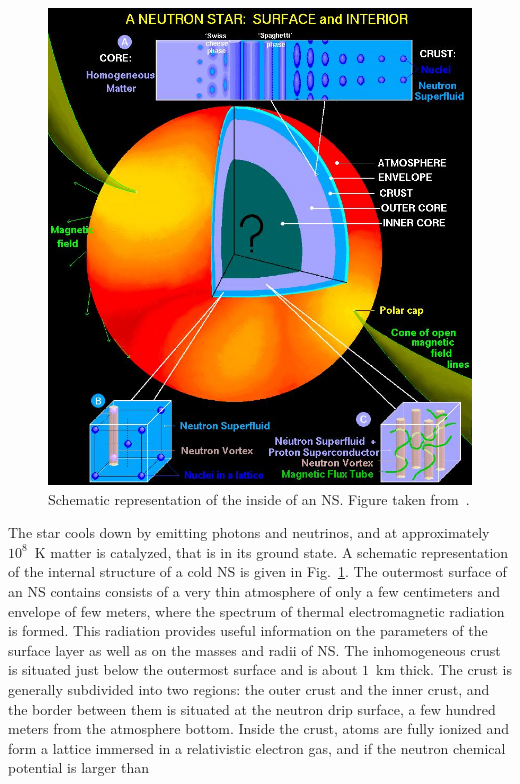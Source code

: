 \begin{figure}[!t]
\begin{center}
  \includegraphics[width=0.8\linewidth]{figures/NStarInt.jpeg}
\end{center}
\caption[Schematic representation of the inside of a neutron star]{Schematic
representation of the inside of an NS. Figure taken 
from~\cite{Page2006}.}\label{fig:NStarInt}
\end{figure}
% 
The star cools down by emitting photons and neutrinos, and at approximately
$10^8$~K matter is catalyzed, that is in its ground state.
A schematic representation of the internal structure of a cold NS is given in
Fig.~\ref{fig:NStarInt}.
The outermost surface of an NS contains consists of a very thin atmosphere of 
only a few centimeters and envelope of few meters, where the spectrum of
thermal electromagnetic radiation is formed. This radiation provides useful 
information on the parameters of the surface layer as well as on the masses and 
radii of NS. 
The inhomogeneous crust is situated just below the outermost surface and is 
about $1$~km thick. 
The crust is generally subdivided into two regions: the outer crust and the 
inner crust, and the border between them is situated at the neutron drip 
surface, a few hundred meters from the atmosphere bottom.
Inside the crust, atoms are fully ionized and form a lattice immersed in a
relativistic electron gas, and if the neutron chemical potential is larger than 
